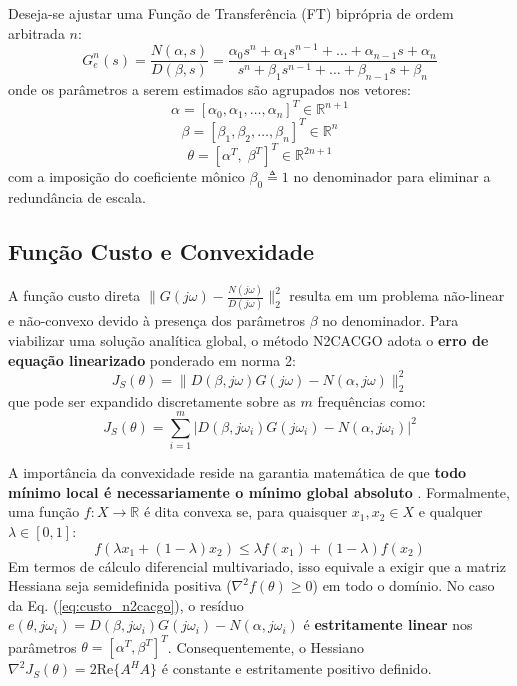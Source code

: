 \documentclass[journal,10pt,twocolumn]{IEEEtran}
\begin{document}
Deseja-se ajustar uma Função de Transferência (FT) biprópria de ordem arbitrada $n$:
\begin{equation}
    G_e^n(s) = \frac{N(\alpha, s)}{D(\beta, s)} = \frac{\alpha_0 s^n + \alpha_1 s^{n-1} + \dots + \alpha_{n-1} s + \alpha_n}{s^n + \beta_1 s^{n-1} + \dots + \beta_{n-1} s + \beta_n}
    \label{eq:modelo_gen}
\end{equation}
onde os parâmetros a serem estimados são agrupados nos vetores:
\begin{equation}
    \alpha = [\alpha_0, \alpha_1, \dots, \alpha_n]^T \in \mathbb{R}^{n+1}
\end{equation}
\begin{equation}
    \beta = [\beta_1, \beta_2, \dots, \beta_n]^T \in \mathbb{R}^n
\end{equation}
\begin{equation}
    \theta = [\alpha^T, \; \beta^T]^T \in \mathbb{R}^{2n+1}
\end{equation}
com a imposição do coeficiente mônico $\beta_0 \triangleq 1$ no denominador para eliminar a redundância de escala.

\subsection{Função Custo e Convexidade}
A função custo direta $\| G(j\omega) - \frac{N(j\omega)}{D(j\omega)} \|_2^2$ resulta em um problema não-linear e não-convexo devido à presença dos parâmetros $\beta$ no denominador. Para viabilizar uma solução analítica global, o método N2CACGO adota o \textbf{erro de equação linearizado} ponderado em norma 2:
\begin{equation}
    J_S(\theta) = \| D(\beta, j\omega) G(j\omega) - N(\alpha, j\omega) \|_2^2
    \label{eq:custo_n2cacgo}
\end{equation}
que pode ser expandido discretamente sobre as $m$ frequências como:
\begin{equation}
    J_S(\theta) = \sum_{i=1}^m | D(\beta, j\omega_i) G(j\omega_i) - N(\alpha, j\omega_i) |^2
\end{equation}

A importância da convexidade reside na garantia matemática de que \textbf{todo mínimo local é necessariamente o mínimo global absoluto} \cite{marcelo2024}. Formalmente, uma função $f: X \to \mathbb{R}$ é dita convexa se, para quaisquer $x_1, x_2 \in X$ e qualquer $\lambda \in [0, 1]$:
\begin{equation}
    f(\lambda x_1 + (1-\lambda) x_2) \le \lambda f(x_1) + (1-\lambda) f(x_2)
    \label{eq:def_convexa}
\end{equation}
Em termos de cálculo diferencial multivariado, isso equivale a exigir que a matriz Hessiana seja semidefinida positiva ($\nabla^2 f(\theta) \ge 0$) em todo o domínio. No caso da Eq. (\ref{eq:custo_n2cacgo}), o resíduo $e(\theta, j\omega_i) = D(\beta, j\omega_i) G(j\omega_i) - N(\alpha, j\omega_i)$ é \textbf{estritamente linear} nos parâmetros $\theta = [\alpha^T, \beta^T]^T$. Consequentemente, o Hessiano $\nabla^2 J_S(\theta) = 2 \text{Re}\{A^H A\}$ é constante e estritamente positivo definido.
\end{document}
